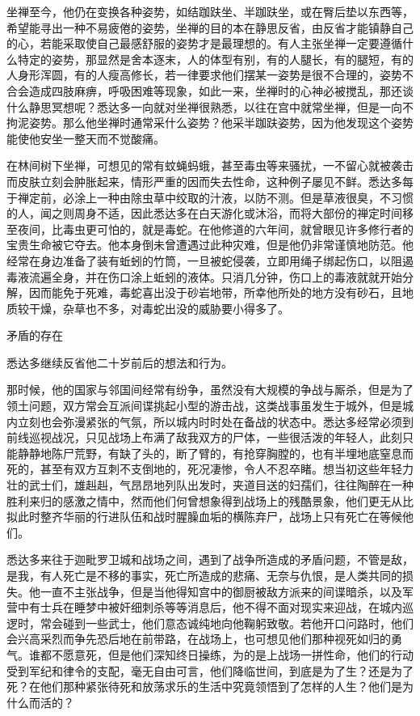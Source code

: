 \documentclass[12pt,twoside,openany]{book}
\begin{document}
坐禅至今，他仍在变换各种姿势，如结跏趺坐、半跏趺坐，或在臀后垫以东西等，希望能寻出一种不易疲倦的姿势，坐禅的目的本在静思反省，由反省才能镇静自己的心，若能采取使自己最感舒服的姿势才是最理想的。有人主张坐禅一定要遵循什么特定的姿势，那显然是舍本逐末，人的体型有别，有的人腿长，有的腿短，有的人身形浑圆，有的人瘦高修长，若一律要求他们摆某一姿势是很不合理的，姿势不合会造成四肢麻痹，呼吸困难等现象，如此一来，坐禅时的心神必被搅乱，那还谈什么静思冥想呢？悉达多一向就对坐禅很熟悉，以往在宫中就常坐禅，但是一向不拘泥姿势。那么他坐禅时通常采什么姿势？他采半跏趺姿势，因为他发现这个姿势能使他安坐一整天而不觉酸痛。

在林间树下坐禅，可想见的常有蚊蝇蚂蛾，甚至毒虫等来骚扰，一不留心就被袭击而皮肤立刻会肿胀起来，情形严重的因而失去性命，这种例子屡见不鲜。悉达多每于禅定前，必涂上一种由除虫草中绞取的汁液，以防不测。但是草液很臭，不习惯的人，闻之则周身不适，因此悉达多在白天游化或沐浴，而将大部份的禅定时间移至夜间，比毒虫更可怕的，就是毒蛇。在他修道的六年间，就曾眼见许多修行者的宝贵生命被它夺去。他本身倒未曾遭遇过此种灾难，但是他仍非常谨慎地防范。他经常在身边准备了装有蚯蚓的竹筒，一旦被蛇侵袭，立即用绳子绑起伤口，以阻遏毒液流遍全身，并在伤口涂上蚯蚓的液体。只消几分钟，伤口上的毒液就就开始分解，因而能免于死难，毒蛇喜出没于砂岩地带，所幸他所处的地方没有砂石，且地质较干燥，杂草也不多，对毒蛇出没的威胁要小得多了。

矛盾的存在

悉达多继续反省他二十岁前后的想法和行为。

那时候，他的国家与邻国间经常有纷争，虽然没有大规模的争战与厮杀，但是为了领土问题，双方常会互派间谍挑起小型的游击战，这类战事虽发生于城外，但是城内立刻也会弥漫紧张的气氛，所以城内时时处在备战的状态中。悉达多经常必须到前线巡视战况，只见战场上布满了敌我双方的尸体，一些很活泼的年轻人，此刻只能静静地陈尸荒野，有缺了头的，断了臂的，有抢穿胸膛的，也有半埋地底窒息而死的，甚至有双方互刺不支倒地的，死况凄惨，令人不忍卒睹。想当初这些年轻力壮的武士们，雄赳赳，气昂昂地列队出发时，夹道目送的妇孺们，往往陶醉在一种胜利来归的感激之情中，然而他们何曾想象得到战场上的残酷景象，他们更无从比拟此时整齐华丽的行进队伍和战时腥臊血垢的横陈弃尸，战场上只有死亡在等候他们。

悉达多来往于迦毗罗卫城和战场之间，遇到了战争所造成的矛盾问题，不管是敌，是我，有人死亡是不移的事实，死亡所造成的悲痛、无奈与仇恨，是人类共同的损失。他一直不主张战争，但是当他得知宫中的御厨被敌方派来的间谍暗杀，以及军营中有士兵在睡梦中被奸细刺杀等等消息后，他不得不面对现实来迎战，在城内巡逻时，常会碰到一些武士，他们意态诚纯地向他鞠躬致敬。若他开口问路时，他们会兴高采烈而争先恐后地在前带路，在战场上，也可想见他们那种视死如归的勇气。谁都不愿意死，但是他们深知终日操练，为的是上战场一拼性命，他们的行动受到军纪和律令的支配，毫无自由可言，他们降临世间，到底是为了生？还是为了死？在他们那种紧张待死和放荡求乐的生活中究竟领悟到了怎样的人生？他们是为什么而活的？
\end{document}

